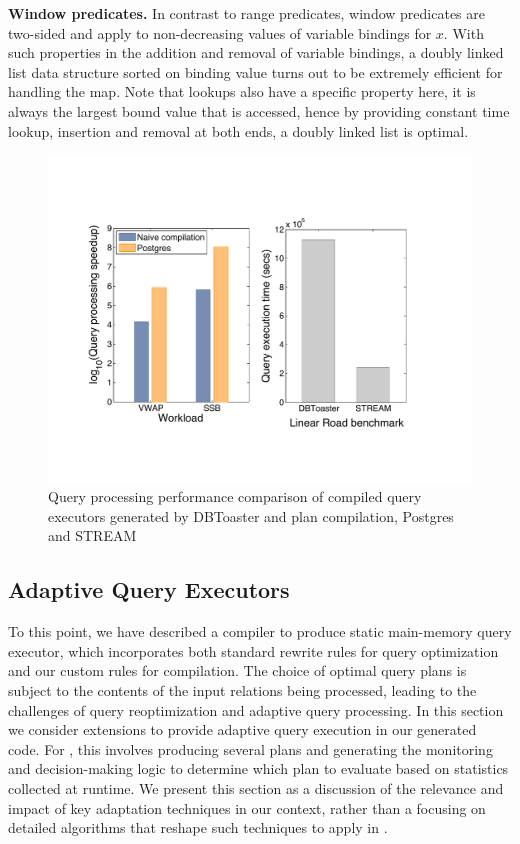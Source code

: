 \textbf{Window predicates.}
In contrast to range predicates, window predicates are two-sided and apply to
non-decreasing values of variable bindings for $x$. With such properties in the
addition and removal of variable bindings, a doubly linked list data structure
sorted on binding value turns out to be extremely efficient for handling the map. Note
that lookups also have a specific property here, it is always the largest bound
value that is accessed, hence by providing constant time lookup, insertion and
removal at both ends, a doubly linked list is optimal.

\begin{figure}[htbp]
\begin{center}
\includegraphics[scale=0.4]{../plots/toaster_comparison.pdf}
\end{center}
\vspace{-4mm}
\caption{Query processing performance comparison of compiled query executors
generated by DBToaster and plan compilation, Postgres and STREAM}
\label{fig:dbtperf}
\end{figure}


\subsection{Adaptive Query Executors}

To this point, we have described a compiler to produce static main-memory query
executor, which incorporates both standard rewrite rules for query optimization
and our custom rules for compilation. The choice of optimal query plans is
subject to the contents of the input relations being processed, leading to the
challenges of query reoptimization and adaptive query processing. In this section
we consider extensions to provide adaptive query execution in our generated code.
For \compiler, this involves producing several plans and generating the
monitoring and decision-making logic to determine which plan to evaluate based on
statistics collected at runtime. We present this section as a discussion of the
relevance and impact of key adaptation techniques in our context, rather than a
focusing on detailed algorithms that reshape such techniques to apply in
\compiler.


